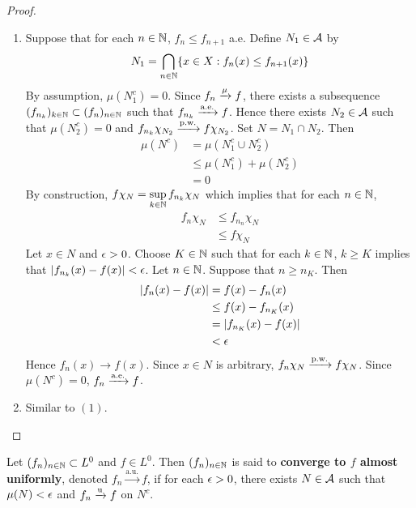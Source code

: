 \documentclass{book}
\begin{document}
	\begin{proof}\
		\begin{enumerate}
			\item Suppose that for each $n \in \mathbb{N}$, $f_n \leq f_{n+1}$ a.e. Define $N_1 \in \mathcal{A}$ by 
			$$N_1 = \bigcap_{n \in \mathbb{N}} \{x \in X: f_n(x) \leq f_{n+1}(x)\}$$ 
			By assumption, $\mu(N_1^c) = 0$. Since $f_n \xrightarrow{\mu} f$, there exists a subsequence $(f_{n_k})_{k \in \mathbb{N}} \subset (f_n)_{n \in \mathbb{N}}$ such that $f_{n_k} \xrightarrow{\text{a.e.}} f$. Hence there exists $N_2 \in \mathcal{A}$ such that $\mu(N_2^c) = 0$ and $f_{n_k} \chi_{N_2} \xrightarrow{\text{p.w.}} f \chi_{N_2}$. Set $N = N_1 \cap N_2$. Then 
			\begin{align*}
				\mu(N^c)
				& = \mu(N_1^c \cup N_2^c) \\
				& \leq \mu(N_1^c) + \mu(N_2^c) \\
				& = 0
			\end{align*}
			By construction, $f \chi_N = \sup\limits_{k \in \mathbb{N}} f_{n_k} \chi_N$ which implies that for each $n \in \mathbb{N}$, 
			\begin{align*}
				f_n \chi_N
				& \leq f_{n_n} \chi_N \\ 
				& \leq f \chi_N
			\end{align*}
			Let $x \in N$ and $\epsilon > 0$. Choose $K \in \mathbb{N}$ such that for each $k \in \mathbb{N}$, $k \geq K$ implies that $|f_{n_k}(x) - f(x)| < \epsilon$. Let $n \in \mathbb{N}$. Suppose that $n \geq n_K$. Then 
			\begin{align*}
				|f_{n}(x) - f(x)|
				& = f(x) - f_{n}(x) \\
				& \leq f(x) - f_{n_K}(x) \\
				& = |f_{n_K}(x) - f(x)| \\
				& < \epsilon 
			\end{align*}
			Hence $f_n(x) \rightarrow f(x)$. Since $x \in N$ is arbitrary, $f_n \chi_N \xrightarrow{\text{p.w.}} f \chi_N$. Since $\mu(N^c) = 0$, $f_n \xrightarrow{\text{a.e.}} f$.
			\item Similar to $(1)$. 
		\end{enumerate}
	\end{proof}
	
	
	\begin{defn}  
		 Let $(f_n)_{n \in \mathbb{N}} \subset L^0$ and $f \in L^0$. Then $(f_n)_{n \in \mathbb{N}}$ is said to \textbf{converge to $f$ almost uniformly}, denoted $f_n \xrightarrow{\text{a.u.}} f$, if for each $\epsilon >0$, there exists $N \in \mathcal{A}$ such that $\mu(N) < \epsilon$ and $f_n \xrightarrow{\text{u}} f$ on $N^c$. 
	\end{defn}	
	
\end{document}
